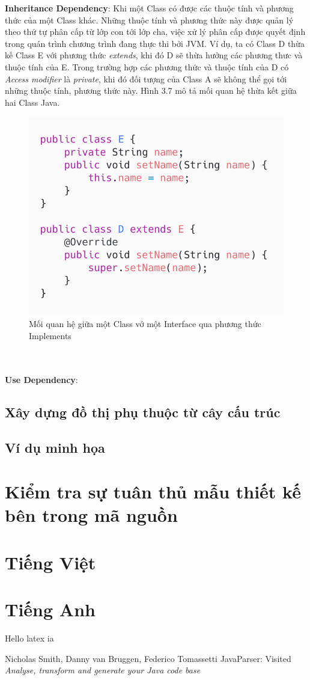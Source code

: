 \documentclass[12pt]{report}
\begin{document}
\pagebreak
\textbf{Inheritance Dependency}: Khi một Class có được các thuộc tính và phương thức của một Class khác. Những thuộc tính và phương thức này được quản lý theo thứ tự phân cấp từ lớp con tới lớp cha, việc xử lý phân cấp được quyết định trong quán trình chương trình đang thực thi bởi JVM. Ví dụ, ta có Class D thừa kế Class E với phương thức \textit{extends}, khi đó D sẽ thừa hưởng các phương thưc và thuộc tính của E. Trong trường hợp các phương thức và thuộc tính của D có \textit{Access modifier} là \textit{private}, khi đó đối tượng của Class A sẽ không thể gọi tới những thuộc tính, phương thức này. Hình 3.7 mô tả mối quan hệ thừa kết giữa hai Class Java.
\begin{figure}[!htbp]
	\centering
	\includegraphics[scale=0.5]{images/D_extends_E}
	\caption{Mối quan hệ giữa một Class vớ một Interface qua phương thức Implements}
	\label{fig:D_extends_E}
\end{figure}\\\\
\textbf{Use Dependency}: 
\newpage
\subsection{Xây dựng đồ thị phụ thuộc từ cây cấu trúc}
\subsection{Ví dụ minh họa}
\section{Kiểm tra sự tuân thủ mẫu thiết kế bên trong mã nguồn}

\begin{thebibliography}{9}
	\section*{Tiếng Việt}
	\section*{Tiếng Anh}
	Hello latex	ia
	
	Nicholas Smith, Danny van Bruggen, Federico Tomassetti
	JavaParser: Visited
	\textit{Analyse, transform and generate your Java code base}
\end{thebibliography}
\end{document}
